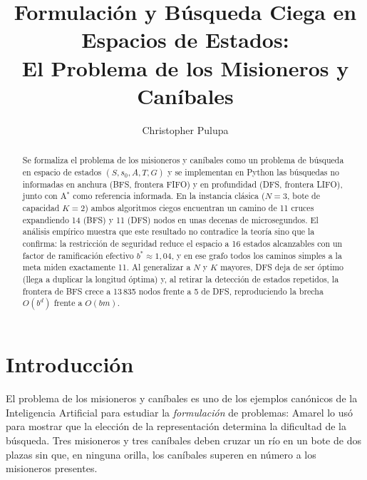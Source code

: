 \documentclass[runningheads]{llncs}
\begin{document}
\title{Formulación y Búsqueda Ciega en Espacios de Estados:\\
El Problema de los Misioneros y Caníbales}

\author{Christopher Pulupa}

\maketitle

\begin{abstract}
Se formaliza el problema de los misioneros y caníbales como un problema de
búsqueda en espacio de estados $(S, s_0, A, T, G)$ y se implementan en Python
las búsquedas no informadas en anchura (BFS, frontera FIFO) y en profundidad
(DFS, frontera LIFO), junto con A$^*$ como referencia informada. En la instancia
clásica ($N=3$, bote de capacidad $K=2$) ambos algoritmos ciegos encuentran un
camino de 11 cruces expandiendo 14 (BFS) y 11 (DFS) nodos en unas decenas de
microsegundos. El análisis empírico muestra que este resultado no contradice la
teoría sino que la confirma: la restricción de seguridad reduce el espacio a
16 estados alcanzables con un factor de ramificación efectivo
$b^*\approx 1{,}04$, y en ese grafo todos los caminos simples a la meta miden
exactamente 11. Al generalizar a $N$ y $K$ mayores, DFS deja de ser óptimo
(llega a duplicar la longitud óptima) y, al retirar la detección de estados
repetidos, la frontera de BFS crece a 13\,835 nodos frente a 5 de DFS,
reproduciendo la brecha $O(b^d)$ frente a $O(bm)$.
\end{abstract}

\section{Introducción}

El problema de los misioneros y caníbales es uno de los ejemplos canónicos de la
Inteligencia Artificial para estudiar la \emph{formulación} de problemas: Amarel
\cite{amarel1968} lo usó para mostrar que la elección de la representación
determina la dificultad de la búsqueda. Tres misioneros y tres caníbales deben
cruzar un río en un bote de dos plazas sin que, en ninguna orilla, los caníbales
superen en número a los misioneros presentes.
\end{document}
